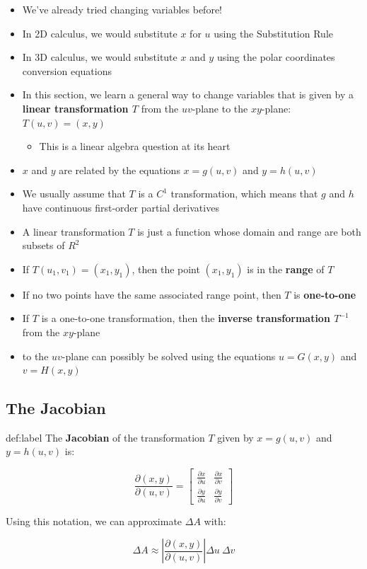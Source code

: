 \documentclass{package/notes}
\begin{document}
\begin{itemize}
	\item We've already tried changing variables before!
	\item In 2D calculus, we would substitute $x$ for $u$ using the Substitution Rule
	\item In 3D calculus, we would substitute $x$ and $y$ using the polar coordinates conversion equations
	\item In this section, we learn a general way to change variables that is given by a \textbf{linear transformation $T$} from the $uv$-plane to the $xy$-plane: $T(u,v) = (x,y)$
	\begin{itemize}
		\item This is a linear algebra question at its heart
	\end{itemize}
	\item $x$ and $y$ are related by the equations $x = g(u,v)$ and $y=h(u,v)$
	\item We usually assume that $T$ is a $C^1$ transformation, which means that $g$ and $h$ have continuous first-order partial derivatives
	\item A linear transformation $T$ is just a function whose domain and range are both subsets of $R^2$
	\item If $T(u_1,v_1) = (x_1,y_1)$, then the point $(x_1,y_1)$ is in the \textbf{range} of $T$
	\item If no two points have the same associated range point, then $T$ is \textbf{one-to-one}
	\item If $T$ is a one-to-one transformation, then the \textbf{inverse transformation $T^{-1}$} from the $xy$-plane
	\item to the $uv$-plane can possibly be solved using the equations $u=G(x,y)$ and $v=H(x,y)$
\end{itemize}


\subsection{The Jacobian}

\begin{definition}{def:label}
	The \textbf{Jacobian} of the transformation $T$ given by $x=g(u,v)$ and $y=h(u,v)$ is:

	$$\frac{\partial(x,y)}{\partial(u,v)}=
	\left[
	\begin{array}{cc}
	\frac{\partial x}{\partial u}&\frac{\partial x}{\partial v}\\
	\frac{\partial y}{\partial u} & \frac{\partial y}{\partial v}
	\end{array}
	\right]$$

	Using this notation, we can approximate $\Delta A$ with:

	$$\Delta A \approx \left|\frac{\partial(x,y)}{\partial(u,v)}\right|\Delta u\:\Delta v$$
\end{definition}
\end{document}
